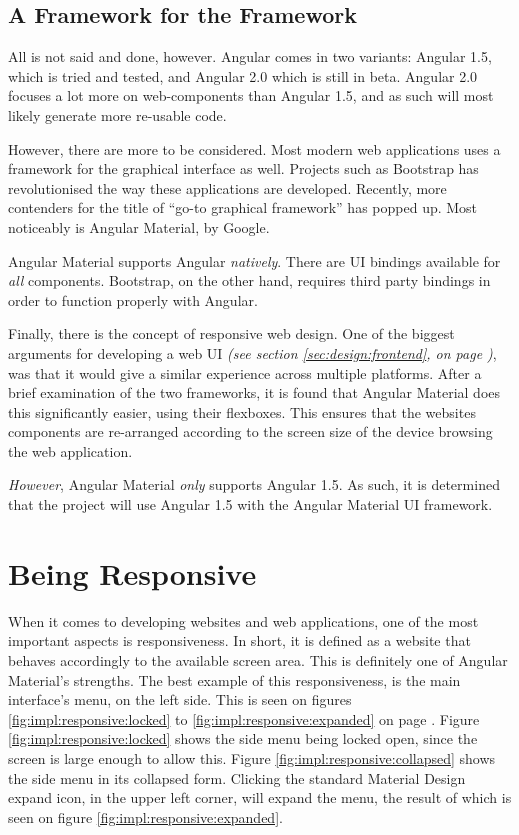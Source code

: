 		\subsection{A Framework for the Framework}
			All is not said and done, however. Angular comes in two variants: Angular 1.5, which is tried and tested, and Angular 2.0 which is still in beta. Angular 2.0 focuses a lot more on web-components than Angular 1.5, and as such will most likely generate more re-usable code. 

			However, there are more to be considered. Most modern web applications uses a framework for the graphical interface as well. Projects such as Bootstrap has revolutionised the way these applications are developed. Recently, more contenders for the title of ``go-to graphical framework'' has popped up. Most noticeably is Angular Material, by Google. 

			Angular Material supports Angular \emph{natively}. There are UI bindings available for \emph{all} components. Bootstrap, on the other hand, requires third party bindings in order to function properly with Angular.

			Finally, there is the concept of responsive web design. One of the biggest arguments for developing a web UI \emph{(see section \ref{sec:design:frontend}, on page \pageref{sec:design:frontend})}, was that it would give a similar experience across multiple platforms. After a brief examination of the two frameworks, it is found that Angular Material does this significantly easier, using their flexboxes. This ensures that the websites components are re-arranged according to the screen size of the device browsing the web application.

			\emph{However}, Angular Material \emph{only} supports Angular 1.5. As such, it is determined that the project will use Angular 1.5 with the Angular Material UI framework.

	\section{Being Responsive}
		When it comes to developing websites and web applications, one of the most important aspects is responsiveness. In short, it is defined as a website that behaves accordingly to the available screen area. This is definitely one of Angular Material's strengths. The best example of this responsiveness, is the main interface's menu, on the left side. This is seen on figures \ref{fig:impl:responsive:locked} to \ref{fig:impl:responsive:expanded} on page \pageref{fig:impl:responsive:locked}. Figure \ref{fig:impl:responsive:locked} shows the side menu being locked open, since the screen is large enough to allow this. Figure \ref{fig:impl:responsive:collapsed} shows the side menu in its collapsed form. Clicking the standard Material Design expand icon, in the upper left corner, will expand the menu, the result of which is seen on figure \ref{fig:impl:responsive:expanded}.

